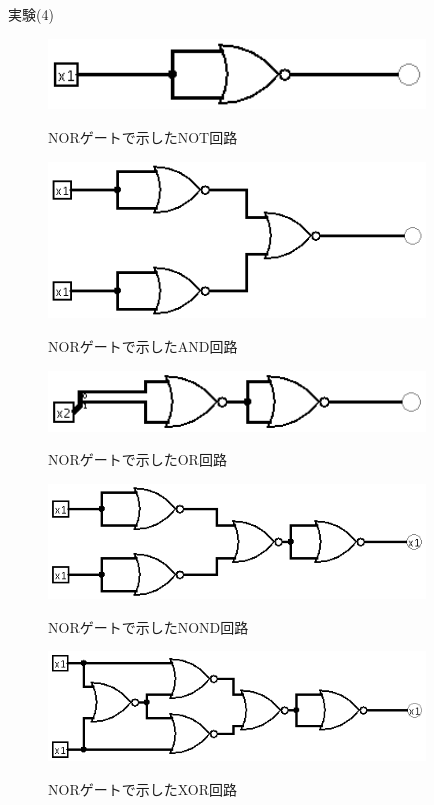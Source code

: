 \documentclass[a4paper,11pt,titlepage]{jarticle}
\begin{document}
実験(4)\par
\begin{figure}[htbp]
  \centering
  \includegraphics[width=100mm]{sample9.png}
  \label{sample8}\\
  \caption{NORゲートで示したNOT回路}
\end{figure}
\par
\begin{figure}[htbp]
  \centering
  \includegraphics[width=100mm]{sample10.png}
  \label{sample9}\\
  \caption{NORゲートで示したAND回路}
\end{figure}
\par
\begin{figure}[htbp]
  \centering
  \includegraphics[width=100mm]{sample11.png}
  \label{sample10}\\
  \caption{NORゲートで示したOR回路}
\end{figure}
\par
\begin{figure}[htbp]
  \centering
  \includegraphics[width=100mm]{sample12.png}
  \label{sampl11}\\
  \caption{NORゲートで示したNOND回路}
\end{figure}
\par
\clearpage
\begin{figure}[htbp]
  \centering
  \includegraphics[width=100mm]{sample13.png}
  \label{sample12}\\
  \caption{NORゲートで示したXOR回路}
\end{figure}
\end{document}
